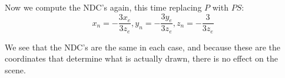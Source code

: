 \documentclass[11pt]{tingpset}
\begin{document}
    Now we compute the NDC's again, this time replacing $P$ with $PS$:
    \[
      x_n = -\frac{3x_e}{3z_e}, y_n = -\frac{3y_e}{3z_e}, z_n = -\frac{3}{3z_e}
    \]

    We see that the NDC's are the same in each case, and because these are the coordinates that determine what is actually drawn, there is no effect on the scene.
\end{document}
